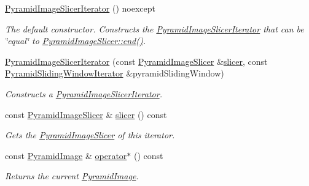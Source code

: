 \begin{DoxyCompactItemize}
\item 
\hyperlink{group___imagery_module_gab8b3f9886530d00229870234b0457e5a}{Pyramid\+Image\+Slicer\+Iterator} () noexcept
\begin{DoxyCompactList}\small\item\em The default constructor. Constructs the \hyperlink{classdg_1_1deepcore_1_1imagery_1_1_pyramid_image_slicer_iterator}{Pyramid\+Image\+Slicer\+Iterator} that can be \char`\"{}equal\char`\"{} to \hyperlink{group___imagery_module_ga6956abd01339df9e8c60963702ce3543}{Pyramid\+Image\+Slicer\+::end()}. \end{DoxyCompactList}\item 
\hyperlink{group___imagery_module_gae2892ba870dde12cc9fe000bd8ef35b4}{Pyramid\+Image\+Slicer\+Iterator} (const \hyperlink{classdg_1_1deepcore_1_1imagery_1_1_pyramid_image_slicer}{Pyramid\+Image\+Slicer} \&\hyperlink{classdg_1_1deepcore_1_1imagery_1_1_pyramid_image_slicer_iterator_a786876d9ddfcb70bbcfb815f71e20f7c}{slicer}, const \hyperlink{classdg_1_1deepcore_1_1imagery_1_1_pyramid_sliding_window_iterator}{Pyramid\+Sliding\+Window\+Iterator} \&pyramid\+Sliding\+Window)
\begin{DoxyCompactList}\small\item\em Constructs a \hyperlink{classdg_1_1deepcore_1_1imagery_1_1_pyramid_image_slicer_iterator}{Pyramid\+Image\+Slicer\+Iterator}. \end{DoxyCompactList}\item 
const \hyperlink{classdg_1_1deepcore_1_1imagery_1_1_pyramid_image_slicer}{Pyramid\+Image\+Slicer} \& \hyperlink{classdg_1_1deepcore_1_1imagery_1_1_pyramid_image_slicer_iterator_a786876d9ddfcb70bbcfb815f71e20f7c}{slicer} () const 
\begin{DoxyCompactList}\small\item\em Gets the \hyperlink{classdg_1_1deepcore_1_1imagery_1_1_pyramid_image_slicer}{Pyramid\+Image\+Slicer} of this iterator. \end{DoxyCompactList}\item 
const \hyperlink{structdg_1_1deepcore_1_1imagery_1_1_pyramid_image}{Pyramid\+Image} \& \hyperlink{group___imagery_module_ga600dc58ba1610e9a397382f55c394c19}{operator$\ast$} () const 
\begin{DoxyCompactList}\small\item\em Returns the current \hyperlink{structdg_1_1deepcore_1_1imagery_1_1_pyramid_image}{Pyramid\+Image}. \end{DoxyCompactList}\item 

\end{DoxyCompactItemize}
